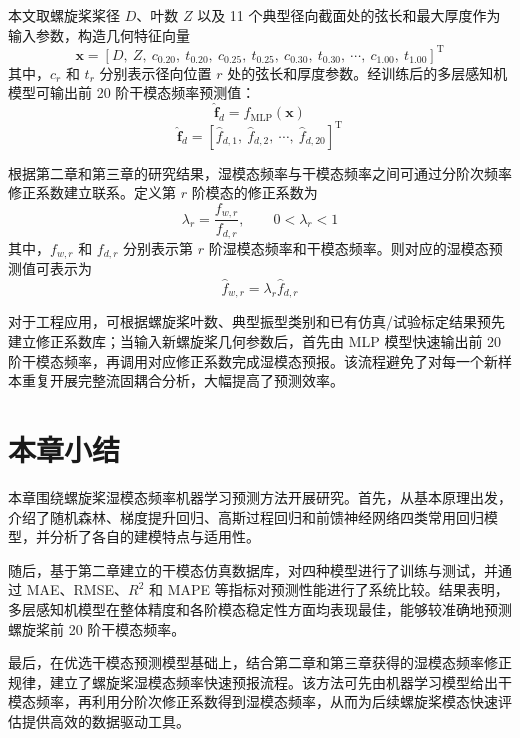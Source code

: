本文取螺旋桨桨径 $D$、叶数 $Z$ 以及 11 个典型径向截面处的弦长和最大厚度作为输入参数，构造几何特征向量
\begin{equation}
  \mathbf{x} =
  [D,\ Z,\ c_{0.20},\ t_{0.20},\ c_{0.25},\ t_{0.25},\ c_{0.30},\ t_{0.30},\ \cdots,\ c_{1.00},\ t_{1.00}]^{\mathrm{T}}
\end{equation}
其中，$c_r$ 和 $t_r$ 分别表示径向位置 $r$ 处的弦长和厚度参数。经训练后的多层感知机模型可输出前 20 阶干模态频率预测值：
\begin{equation}
  \hat{\mathbf{f}}_d = f_{\mathrm{MLP}}(\mathbf{x})
\end{equation}
\begin{equation}
  \hat{\mathbf{f}}_d =
  [\hat{f}_{d,1},\ \hat{f}_{d,2},\ \cdots,\ \hat{f}_{d,20}]^{\mathrm{T}}
\end{equation}

根据第二章和第三章的研究结果，湿模态频率与干模态频率之间可通过分阶次频率修正系数建立联系。定义第 $r$ 阶模态的修正系数为
\begin{equation}
  \lambda_r = \frac{f_{w,r}}{f_{d,r}},
  \qquad 0 < \lambda_r < 1
\end{equation}
其中，$f_{w,r}$ 和 $f_{d,r}$ 分别表示第 $r$ 阶湿模态频率和干模态频率。则对应的湿模态预测值可表示为
\begin{equation}
  \hat{f}_{w,r} = \lambda_r \hat{f}_{d,r}
\end{equation}

对于工程应用，可根据螺旋桨叶数、典型振型类别和已有仿真/试验标定结果预先建立修正系数库；当输入新螺旋桨几何参数后，首先由 MLP 模型快速输出前 20 阶干模态频率，再调用对应修正系数完成湿模态预报。该流程避免了对每一个新样本重复开展完整流固耦合分析，大幅提高了预测效率。

\section{本章小结}

本章围绕螺旋桨湿模态频率机器学习预测方法开展研究。首先，从基本原理出发，介绍了随机森林、梯度提升回归、高斯过程回归和前馈神经网络四类常用回归模型，并分析了各自的建模特点与适用性。

随后，基于第二章建立的干模态仿真数据库，对四种模型进行了训练与测试，并通过 MAE、RMSE、$R^2$ 和 MAPE 等指标对预测性能进行了系统比较。结果表明，多层感知机模型在整体精度和各阶模态稳定性方面均表现最佳，能够较准确地预测螺旋桨前 20 阶干模态频率。

最后，在优选干模态预测模型基础上，结合第二章和第三章获得的湿模态频率修正规律，建立了螺旋桨湿模态频率快速预报流程。该方法可先由机器学习模型给出干模态频率，再利用分阶次修正系数得到湿模态频率，从而为后续螺旋桨模态快速评估提供高效的数据驱动工具。
